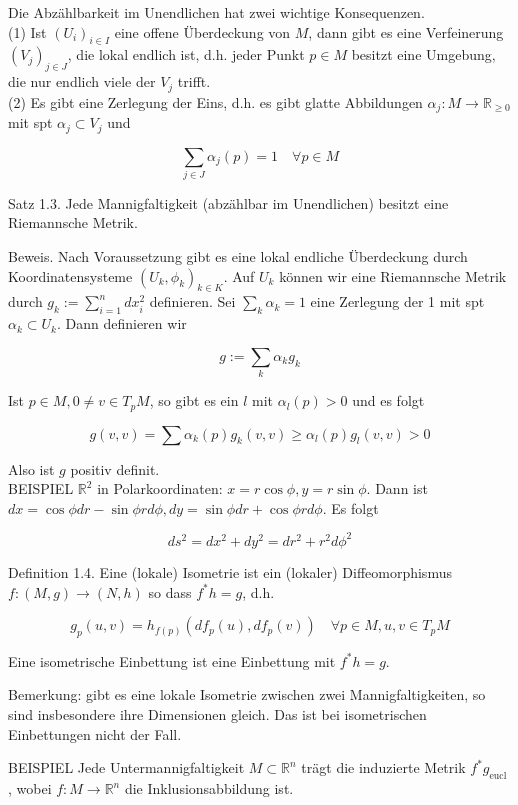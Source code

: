 \documentclass[10pt, letterpaper]{article}
\begin{document}
Die Abzählbarkeit im Unendlichen hat zwei wichtige Konsequenzen.\\
(1) Ist $\left(U_{i}\right)_{i \in I}$ eine offene Überdeckung von $M$, dann gibt es eine Verfeinerung $\left(V_{j}\right)_{j \in J}$, die lokal endlich ist, d.h. jeder Punkt $p \in M$ besitzt eine Umgebung, die nur endlich viele der $V_{j}$ trifft.\\
(2) Es gibt eine Zerlegung der Eins, d.h. es gibt glatte Abbildungen $\alpha_{j}: M \rightarrow \mathbb{R}_{\geq 0}$ mit spt $\alpha_{j} \subset V_{j}$ und

$$
\sum_{j \in J} \alpha_{j}(p)=1 \quad \forall p \in M
$$

Satz 1.3. Jede Mannigfaltigkeit (abzählbar im Unendlichen) besitzt eine Riemannsche Metrik.

Beweis. Nach Voraussetzung gibt es eine lokal endliche Überdeckung durch Koordinatensysteme $\left(U_{k}, \phi_{k}\right)_{k \in K}$. Auf $U_{k}$ können wir eine Riemannsche Metrik durch $g_{k}:=\sum_{i=1}^{n} d x_{i}^{2}$ definieren. Sei $\sum_{k} \alpha_{k}=1$ eine Zerlegung der 1 mit spt $\alpha_{k} \subset U_{k}$. Dann definieren wir

$$
g:=\sum_{k} \alpha_{k} g_{k}
$$

Ist $p \in M, 0 \neq v \in T_{p} M$, so gibt es ein $l$ mit $\alpha_{l}(p)>0$ und es folgt

$$
g(v, v)=\sum \alpha_{k}(p) g_{k}(v, v) \geq \alpha_{l}(p) g_{l}(v, v)>0
$$

Also ist $g$ positiv definit.\\
BEISPIEL $\mathbb{R}^{2}$ in Polarkoordinaten: $x=r \cos \phi, y=r \sin \phi$. Dann ist $d x=\cos \phi d r-\sin \phi r d \phi, d y=\sin \phi d r+\cos \phi r d \phi$. Es folgt

$$
d s^{2}=d x^{2}+d y^{2}=d r^{2}+r^{2} d \phi^{2}
$$

Definition 1.4. Eine (lokale) Isometrie ist ein (lokaler) Diffeomorphismus $f:(M, g) \rightarrow(N, h)$ so dass $f^{*} h=g$, d.h.

$$
g_{p}(u, v)=h_{f(p)}\left(d f_{p}(u), d f_{p}(v)\right) \quad \forall p \in M, u, v \in T_{p} M
$$

Eine isometrische Einbettung ist eine Einbettung mit $f^{*} h=g$.

Bemerkung: gibt es eine lokale Isometrie zwischen zwei Mannigfaltigkeiten, so sind insbesondere ihre Dimensionen gleich. Das ist bei isometrischen Einbettungen nicht der Fall.

BEISPIEL Jede Untermannigfaltigkeit $M \subset \mathbb{R}^{n}$ trägt die induzierte Metrik $f^{*} g_{\text {eucl }}$, wobei $f: M \rightarrow \mathbb{R}^{n}$ die Inklusionsabbildung ist.
\end{document}
